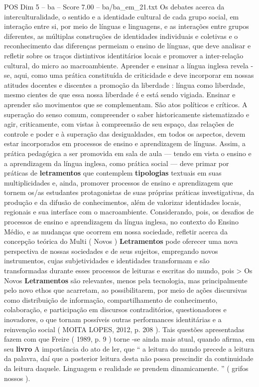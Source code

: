 \begin{textsample}{POS Dim 5 – ba – Score 7.00 – ba/ba\_em\_21.txt}
Os debates acerca da interculturalidade, o sentido e a identidade cultural de cada grupo social, em interação entre si, por meio de línguas e linguagens, e as interações entre grupos diferentes, as múltiplas construções de identidades individuais e coletivas e o reconhecimento das diferenças permeiam o ensino de línguas, que deve analisar e refletir sobre os traços distintivos identitários locais e promover a inter-relação cultural, do micro ao macroambiente.
Aprender e ensinar a língua inglesa revela -se, aqui, como uma prática constituída de criticidade e deve incorporar em nossas atitudes docentes e discentes a promoção da liberdade : língua como liberdade, mesmo cientes de que essa nossa liberdade é e está sendo vigiada.
Ensinar e aprender são movimentos que se complementam.
São atos políticos e críticos.
A superação do senso comum, compreender o saber historicamente sistematizado e agir, criticamente, com vistas à compreensão de seu espaço, das relações de controle e poder e à superação das desigualdades, em todos os aspectos, devem estar incorporados em processos de ensino e aprendizagem de línguas.
Assim, a prática pedagógica a ser promovida em sala de aula — tendo em vista o ensino e a aprendizagem da língua inglesa, como prática social — deve primar por práticas de \textbf{letramentos} que contemplem \textbf{tipologias} textuais em suas multiplicidades e, ainda, promover processos de ensino e aprendizagem que tornem os/as estudantes protagonistas de suas próprias práticas investigativas, da produção e da difusão de conhecimentos, além de valorizar identidades locais, regionais e sua interface com o macroambiente.
Considerando, pois, os desafios de processos de ensino e aprendizagem da língua inglesa, no contexto do Ensino Médio, e as mudanças que ocorrem em nossa sociedade, refletir acerca da concepção teórica do Multi ( Novos ) \textbf{Letramentos} pode oferecer uma nova perspectiva de nossas sociedades e de seus sujeitos, empregando novos instrumentos, cujas subjetividades e identidades transformam e são transformadas durante esses processos de leituras e escritas do mundo, pois > Os Novos \textbf{Letramentos} são relevantes, menos pela tecnologia, mas principalmente pelo novo ethos que acarretam, ao possibilitarem, por meio de ações discursivas como distribuição de informação, compartilhamento de conhecimento, colaboração, e participação em discursos contraditórios, questionadores e inovadores, o que tornam possíveis outras performances identitárias e a reinvenção social ( MOITA LOPES, 2012, p. 208 ).
Tais questões apresentadas fazem com que Freire ( 1989, p. 9 ) torne -se ainda mais atual, quando afirma, em seu \textbf{livro} A importância do ato de ler, que “ a leitura do mundo precede a leitura da palavra, daí que a posterior leitura desta não possa prescindir da continuidade da leitura daquele.
Linguagem e realidade se prendem dinamicamente. ” ( grifos nossos ).

\end{textsample}
